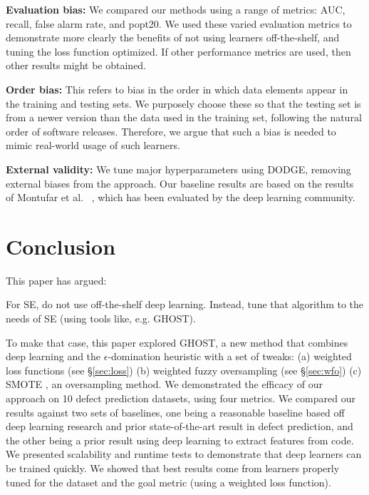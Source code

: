 \documentclass[10pt,compsoc,twocolumn]{IEEEtran}
\begin{document}
\textbf{Evaluation bias:} We compared our methods using a range of   metrics: AUC, recall, false alarm rate, and popt20. We used these  varied evaluation metrics to demonstrate more clearly the benefits of not using learners off-the-shelf, and tuning the loss function optimized. If other performance metrics are used, then other results might be obtained.

\textbf{Order bias:} This refers to bias in the order in which data elements appear in the training and testing sets. We purposely choose these so that the testing set is from a newer version than the data used in the training set, following the natural order of software releases. Therefore, we argue that such a bias is needed to mimic real-world usage of such learners.

\textbf{External validity:} We tune major hyperparameters using DODGE, removing external biases from the approach. Our baseline results are based on the results of Montufar et al. ~\cite{montufar2014number}, which has been evaluated by the deep learning community.

\section{Conclusion}
\label{sec:conclusion}

This paper has argued:

 \begin{blockquote}
    \noindent
    For SE,  do not use   off-the-shelf  deep learning. 
  Instead,
tune that algorithm to the needs of SE (using tools like, e.g. GHOST).
\end{blockquote}
To make that case, this paper explored   GHOST, a new method that combines deep learning
and the $\epsilon$-domination heuristic with a set of tweaks: (a) weighted loss functions (see \S\ref{sec:loss}) (b) weighted fuzzy oversampling (see \S\ref{sec:wfo}) (c) SMOTE \cite{Chawla02}, an oversampling method.
 We demonstrated the efficacy of our approach on 10 defect prediction datasets, using four metrics. We compared our results against two sets of baselines, one being a reasonable baseline based off deep learning research and prior state-of-the-art result in defect prediction, and the other being a prior result using deep learning to extract features from code.  
 We presented scalability and runtime tests to demonstrate that deep learners can be trained quickly.
We showed that best results come from  learners properly tuned for the dataset and the goal metric (using a weighted loss function). 
 
\end{document}

